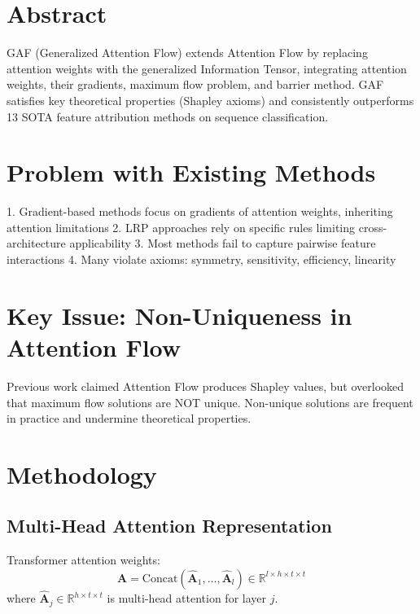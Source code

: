 
\section{Abstract}
GAF (Generalized Attention Flow) extends Attention Flow by replacing attention weights with the generalized Information Tensor, integrating attention weights, their gradients, maximum flow problem, and barrier method. GAF satisfies key theoretical properties (Shapley axioms) and consistently outperforms 13 SOTA feature attribution methods on sequence classification.

\section{Problem with Existing Methods}
1. Gradient-based methods focus on gradients of attention weights, inheriting attention limitations
2. LRP approaches rely on specific rules limiting cross-architecture applicability
3. Most methods fail to capture pairwise feature interactions
4. Many violate axioms: symmetry, sensitivity, efficiency, linearity

\section{Key Issue: Non-Uniqueness in Attention Flow}
Previous work claimed Attention Flow produces Shapley values, but overlooked that maximum flow solutions are NOT unique. Non-unique solutions are frequent in practice and undermine theoretical properties.

\section{Methodology}

\subsection{Multi-Head Attention Representation}
Transformer attention weights:
\begin{equation}
\mathbf{A} = \text{Concat}(\hat{\mathbf{A}}_1, \ldots, \hat{\mathbf{A}}_l) \in \mathbb{R}^{l \times h \times t \times t}
\end{equation}
where $\hat{\mathbf{A}}_j \in \mathbb{R}^{h \times t \times t}$ is multi-head attention for layer $j$.

